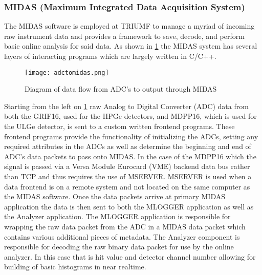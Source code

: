 \documentclass[jon_ringuette_thesis_proposal.tex]{subfiles}
\begin{document}



    \subsubsection{MIDAS (Maximum Integrated Data Acquisition System) \cite{Garnsworthy2017a} }

    The MIDAS software is employed at TRIUMF to manage a myriad of incoming raw instrument data and provides a framework to save, decode, and perform basic online analysis for said data.
    As shown in \ref{fig:ADC_TO_MIDAS} the MIDAS system has several layers of interacting programs which are largely written in C/C++.

    \begin{figure}[H]
        \texttt{[image: adctomidas.png]}
        \caption{\small Diagram of data flow from ADC's to output through MIDAS}
        \label{fig:ADC_TO_MIDAS}
    \end{figure}

    Starting from the left on \ref{fig:ADC_TO_MIDAS} raw Analog to Digital Converter (ADC) data from both the GRIF16, used for the HPGe detectors, and MDPP16, which is used for the ULGe detector, is sent to a custom written frontend programs.
    These frontend programs provide the functionality of initializing the ADCs, setting any required attributes in the ADCs as well as determine the beginning and end of ADC's data packets to pass onto MIDAS.
    In the case of the MDPP16 which the signal is passed via a Versa Module Eurocard (VME) backend data bus rather than TCP and thus requires the use of MSERVER.
    MSERVER is used when a data frontend is on a remote system and not located on the same computer as the MIDAS software.
    Once the data packets arrive at primary MIDAS application the data is then sent to both the MLOGGER application as well as the Analyzer application.
    The MLOGGER application is responsible for wrapping the raw data packet from the ADC in a MIDAS data packet which contains various additional pieces of metadata.
    The Analyzer component is responsible for decoding the raw binary data packet for use by the online analyzer.
    In this case that is hit value and detector channel number allowing for building of basic histograms in near realtime.
\end{document}
